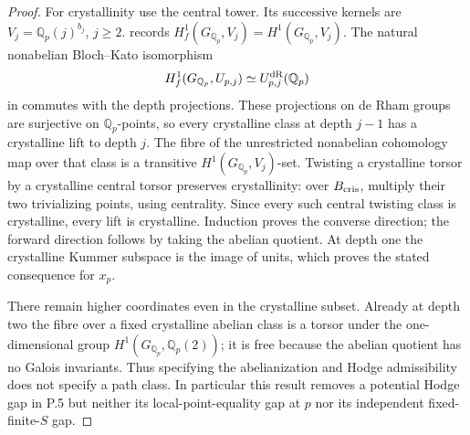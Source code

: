 \begin{proof}
For crystallinity use the central tower. Its successive kernels are
\(V_j=\mathbb Q_p(j)^{b_j}\), \(j\ge2\).
\citet[Appendix A, author p.~47, citing Bloch--Kato, Example 3.9]{LitBKL2026}
records \(H_f^1(G_{\mathbb Q_p},V_j)=H^1(G_{\mathbb Q_p},V_j)\).
The natural nonabelian Bloch--Kato isomorphism
\[
 H_f^1(G_{\mathbb Q_p},U_{p,j})
       \simeq U_{p,j}^{\rm dR}(\mathbb Q_p)
\]
in \citet[\S3.3, equation (3.8), author p.~27]{LitBKL2026}
commutes with the depth projections. These projections on de Rham groups
are surjective on \(\mathbb Q_p\)-points, so every crystalline class
at depth \(j-1\) has a crystalline lift to depth \(j\).
The fibre of the unrestricted nonabelian cohomology map over that class
is a transitive \(H^1(G_{\mathbb Q_p},V_j)\)-set.
Twisting a crystalline torsor by a crystalline central torsor preserves
crystallinity: over \(B_{\rm cris}\), multiply their two trivializing
points, using centrality. Since every such central twisting class is
crystalline, every lift is crystalline. Induction proves the converse
direction; the forward direction follows by taking the abelian quotient.
At depth one the crystalline Kummer subspace is the image of units,
which proves the stated consequence for \(x_p\).

There remain higher coordinates even in the crystalline subset. Already
at depth two the fibre over a fixed crystalline abelian class is a
torsor under the one-dimensional group
\(H^1(G_{\mathbb Q_p},\mathbb Q_p(2))\); it is free because the
abelian quotient has no Galois invariants. Thus specifying the
abelianization and Hodge admissibility does not specify a path class.
In particular this result removes a potential Hodge gap in P.5 but
neither its local-point-equality gap at \(p\) nor its independent
fixed-finite-\(S\) gap.
\end{proof}

